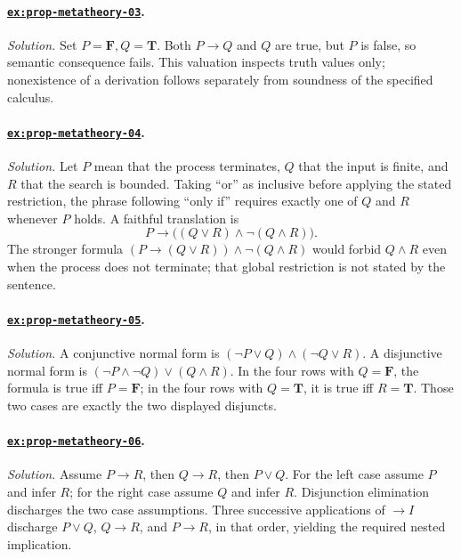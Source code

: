 \documentclass[11pt,oneside,openany]{book}
\theoremstyle{definition}
\theoremstyle{plain}
\theoremstyle{remark}
\newcommand{\True}{\mathbf{T}}
\newcommand{\False}{\mathbf{F}}
\begin{document}
\paragraph{\hyperref[ex:prop-metatheory-03]{\texttt{ex:prop-metatheory-03}}.}
\textit{Solution.}  Set \(P=\False,Q=\True\).  Both \(P\to Q\) and \(Q\) are
true, but \(P\) is false, so semantic consequence fails.  This valuation
inspects truth values only; nonexistence of a derivation follows separately
from soundness of the specified calculus.

\paragraph{\hyperref[ex:prop-metatheory-04]{\texttt{ex:prop-metatheory-04}}.}
\textit{Solution.}  Let \(P\) mean that the process terminates, \(Q\)
that the input is finite, and \(R\) that the search is bounded.  Taking
``or'' as inclusive before applying the stated restriction, the phrase
following ``only if'' requires exactly one of \(Q\) and \(R\) whenever
\(P\) holds.  A faithful translation is
\[
  P\to\bigl((Q\lor R)\land\neg(Q\land R)\bigr).
\]
The stronger formula
\((P\to(Q\lor R))\land\neg(Q\land R)\) would forbid \(Q\land R\) even when
the process does not terminate; that global restriction is not stated by the
sentence.

\paragraph{\hyperref[ex:prop-metatheory-05]{\texttt{ex:prop-metatheory-05}}.}
\textit{Solution.}  A conjunctive normal form is
\((\neg P\lor Q)\land(\neg Q\lor R)\).  A disjunctive normal form is
\((\neg P\land\neg Q)\lor(Q\land R)\).  In the four rows with
\(Q=\False\), the formula is true iff \(P=\False\); in the four rows
with \(Q=\True\), it is true iff \(R=\True\).  Those two cases are
exactly the two displayed
disjuncts.

\paragraph{\hyperref[ex:prop-metatheory-06]{\texttt{ex:prop-metatheory-06}}.}
\textit{Solution.}  Assume \(P\to R\), then \(Q\to R\), then \(P\lor Q\).
For the left case assume \(P\) and infer \(R\); for the right case assume
\(Q\) and infer \(R\).  Disjunction elimination discharges the two case
assumptions.  Three successive applications of \(\to I\) discharge
\(P\lor Q\), \(Q\to R\), and \(P\to R\), in that order, yielding the required
nested implication.
\end{document}
